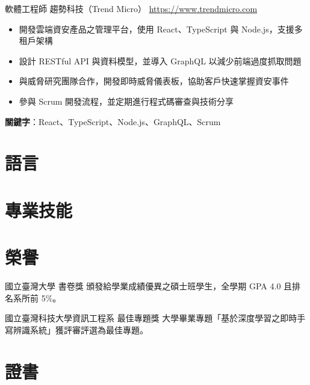 \documentclass[a4paper, serif, 10pt]{moderncv}
\begin{document}
        {軟體工程師}
        {趨勢科技（Trend Micro）}
        {\url{https://www.trendmicro.com}}
        {}
        {\begin{itemize}
\item 開發雲端資安產品之管理平台，使用 React、TypeScript 與 Node.js，支援多租戶架構
\item 設計 RESTful API 與資料模型，並導入 GraphQL 以減少前端過度抓取問題
\item 與威脅研究團隊合作，開發即時威脅儀表板，協助客戶快速掌握資安事件
\item 參與 Scrum 開發流程，並定期進行程式碼審查與技術分享
\end{itemize}
\textbf{關鍵字}：React、TypeScript、Node.js、GraphQL、Scrum}
\section{語言}

\section{專業技能}

\section{榮譽}

        {國立臺灣大學}
        {書卷獎}
        {}
        {}
        {頒發給學業成績優異之碩士班學生，全學期 GPA 4.0 且排名系所前 5\%。}

        {國立臺灣科技大學資訊工程系}
        {最佳專題獎}
        {}
        {}
        {大學畢業專題「基於深度學習之即時手寫辨識系統」獲評審評選為最佳專題。}
\section{證書}
\end{document}
